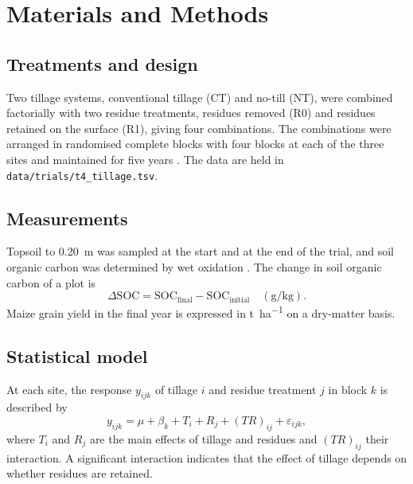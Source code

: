 \section{Materials and Methods}

\subsection{Treatments and design}
Two tillage systems, conventional tillage (CT) and no-till (NT), were combined
factorially with two residue treatments, residues removed (R0) and residues
retained on the surface (R1), giving four combinations. The combinations were
arranged in randomised complete blocks with four blocks at each of the three
sites and maintained for five years \parencite{gomez1984}. The data are held in
\texttt{data/trials/t4\_tillage.tsv}.

\subsection{Measurements}
Topsoil to \SI{0.20}{\metre} was sampled at the start and at the end of the
trial, and soil organic carbon was determined by wet oxidation
\parencite{walkley1934}. The change in soil organic carbon of a plot is
\begin{equation}
  \Delta\mathrm{SOC} = \mathrm{SOC}_{\mathrm{final}} - \mathrm{SOC}_{\mathrm{initial}}
  \quad (\si{\gram\per\kilo\gram}).
  \label{eq:dsoc}
\end{equation}
Maize grain yield in the final year is expressed in \si{\tonne\per\hectare} on a
dry-matter basis.

\subsection{Statistical model}
At each site, the response $y_{ijk}$ of tillage $i$ and residue treatment $j$ in
block $k$ is described by
\begin{equation}
  y_{ijk} = \mu + \beta_k + T_i + R_j + (TR)_{ij} + \varepsilon_{ijk},
  \label{eq:factorial}
\end{equation}
where $T_i$ and $R_j$ are the main effects of tillage and residues and
$(TR)_{ij}$ their interaction. A significant interaction indicates that the
effect of tillage depends on whether residues are retained.
